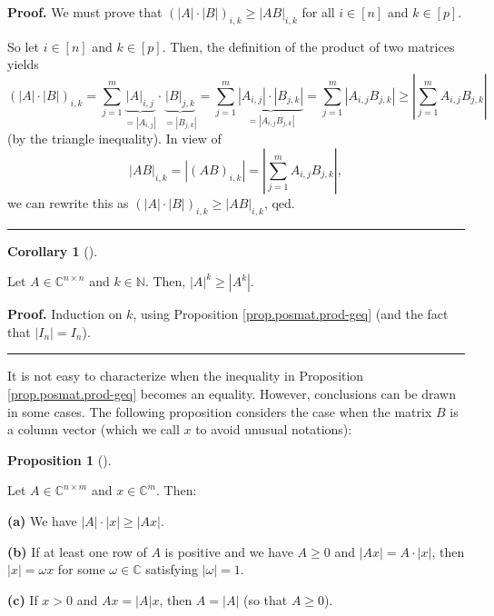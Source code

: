 \documentclass[numbers=enddot,12pt,final,onecolumn,notitlepage]{scrartcl}%
\numberwithin{exer}{subsection}
\theoremstyle{definition}
\newtheorem{prop}[theo]{Proposition}
\newenvironment{proposition}[1][]
{\begin{prop}[#1]\begin{leftbar}}
{\end{leftbar}\end{prop}}
\newtheorem{coro}[theo]{Corollary}
\newenvironment{corollary}[1][]
{\begin{coro}[#1]\begin{leftbar}}
{\end{leftbar}\end{coro}}
\newenvironment{proof}[1][Proof]{\noindent\textbf{#1.} }{\ \rule{0.5em}{0.5em}}
\let\sumnonlimits\sum
\renewcommand{\sum}{\sumnonlimits\limits}
\begin{document}
\begin{proof}
We must prove that $\left(  \left\vert A\right\vert \cdot\left\vert
B\right\vert \right)  _{i,k}\geq\left\vert AB\right\vert _{i,k}$ for all
$i\in\left[  n\right]  $ and $k\in\left[  p\right]  $.

So let $i\in\left[  n\right]  $ and $k\in\left[  p\right]  $. Then, the
definition of the product of two matrices yields
\[
\left(  \left\vert A\right\vert \cdot\left\vert B\right\vert \right)
_{i,k}=\sum_{j=1}^{m}\underbrace{\left\vert A\right\vert _{i,j}}_{=\left\vert
A_{i,j}\right\vert }\cdot\underbrace{\left\vert B\right\vert _{j,k}%
}_{=\left\vert B_{j,k}\right\vert }=\sum_{j=1}^{m}\underbrace{\left\vert
A_{i,j}\right\vert \cdot\left\vert B_{j,k}\right\vert }_{=\left\vert
A_{i,j}B_{j,k}\right\vert }=\sum_{j=1}^{m}\left\vert A_{i,j}B_{j,k}\right\vert
\geq\left\vert \sum_{j=1}^{m}A_{i,j}B_{j,k}\right\vert
\]
(by the triangle inequality). In view of%
\[
\left\vert AB\right\vert _{i,k}=\left\vert \left(  AB\right)  _{i,k}%
\right\vert =\left\vert \sum_{j=1}^{m}A_{i,j}B_{j,k}\right\vert ,
\]
we can rewrite this as $\left(  \left\vert A\right\vert \cdot\left\vert
B\right\vert \right)  _{i,k}\geq\left\vert AB\right\vert _{i,k}$, qed.
\end{proof}

\begin{corollary}
\label{cor.posmat.pow-geq}Let $A\in\mathbb{C}^{n\times n}$ and $k\in
\mathbb{N}$. Then, $\left\vert A\right\vert ^{k}\geq\left\vert A^{k}%
\right\vert $.
\end{corollary}

\begin{proof}
Induction on $k$, using Proposition \ref{prop.posmat.prod-geq} (and the fact
that $\left\vert I_{n}\right\vert =I_{n}$).
\end{proof}

It is not easy to characterize when the inequality in Proposition
\ref{prop.posmat.prod-geq} becomes an equality. However, conclusions can be
drawn in some cases. The following proposition considers the case when the
matrix $B$ is a column vector (which we call $x$ to avoid unusual notations):

\begin{proposition}
\label{prop.posmat.prod-geq-Ax}Let $A\in\mathbb{C}^{n\times m}$ and
$x\in\mathbb{C}^{m}$. Then: \medskip

\textbf{(a)} We have $\left\vert A\right\vert \cdot\left\vert x\right\vert
\geq\left\vert Ax\right\vert $. \medskip

\textbf{(b)} If at least one row of $A$ is positive and we have $A\geq0$ and
$\left\vert Ax\right\vert =A\cdot\left\vert x\right\vert $, then $\left\vert
x\right\vert =\omega x$ for some $\omega\in\mathbb{C}$ satisfying $\left\vert
\omega\right\vert =1$. \medskip

\textbf{(c)} If $x>0$ and $Ax=\left\vert A\right\vert x$, then $A=\left\vert
A\right\vert $ (so that $A\geq0$).
\end{proposition}
\end{document}
